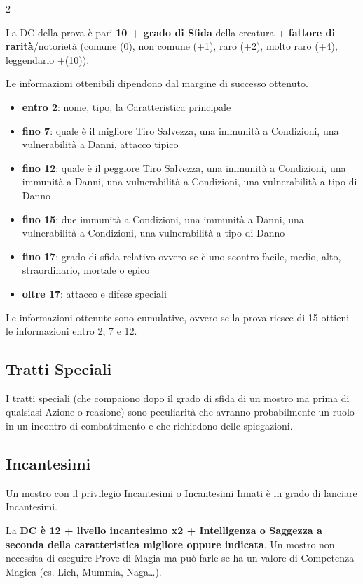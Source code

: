 \begin{multicols}{2}
\medskip

La DC della prova è pari \textbf{10 + grado di Sfida} della creatura + \textbf{fattore di rarità}/notorietà (comune (0), non comune (+1), raro (+2), molto raro (+4), leggendario +(10)).

Le informazioni ottenibili dipendono dal margine di successo ottenuto.

\noindent\begin{itemize} \setlength{\itemsep}{0pt}
\item \textbf{entro 2}: nome, tipo, la Caratteristica principale
\item \textbf{fino 7}: quale è il migliore Tiro Salvezza, una immunità a Condizioni, una vulnerabilità a Danni, attacco tipico
\item \textbf{fino 12}: quale è il peggiore Tiro Salvezza, una immunità a Condizioni, una immunità a Danni, una vulnerabilità a Condizioni, una vulnerabilità a tipo di Danno
\item \textbf{fino 15}: due immunità a Condizioni, una immunità a Danni, una vulnerabilità a Condizioni, una vulnerabilità a tipo di Danno
\item \textbf{fino 17}: grado di sfida relativo ovvero se è uno scontro facile, medio, alto, straordinario, mortale o epico
\item \textbf{oltre 17}: attacco e difese speciali
\end{itemize}

\medskip

Le informazioni ottenute sono cumulative, ovvero se la prova riesce di 15 ottieni le informazioni entro 2, 7 e 12.

\subsection{Tratti Speciali}

I tratti speciali (che compaiono dopo il grado di sfida di un mostro ma prima di qualsiasi Azione o reazione) sono peculiarità che avranno probabilmente un ruolo in un incontro di combattimento e che richiedono delle spiegazioni.

\subsection{Incantesimi}

Un mostro con il privilegio Incantesimi o Incantesimi Innati è in grado di lanciare Incantesimi.

La \textbf{DC è 12 + livello incantesimo x2 + Intelligenza o Saggezza a seconda della caratteristica migliore oppure indicata}. Un mostro non necessita di eseguire Prove di Magia ma può farle se ha un valore di Competenza Magica (es. Lich, Mummia, Naga…).


\end{multicols}
